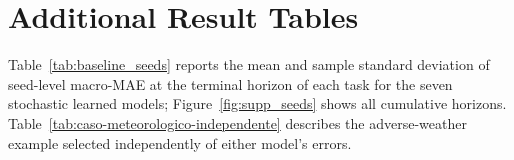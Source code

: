 \documentclass[final,3p,times]{elsarticle}
\renewcommand{\thetable}{S\arabic{table}}
\renewcommand{\thefigure}{S\arabic{figure}}
\begin{document}
\appendix
\renewcommand{\thetable}{S\arabic{table}}
\renewcommand{\thefigure}{S\arabic{figure}}


\section{Additional Result Tables}
Table~\ref{tab:baseline_seeds} reports the mean and sample standard deviation
of seed-level macro-MAE at the terminal horizon of each task for the seven
stochastic learned models; Figure~\ref{fig:supp_seeds} shows all cumulative
horizons. Table~\ref{tab:caso-meteorologico-independente}
describes the adverse-weather example selected independently of either
model's errors.



\FloatBarrier


\end{document}
